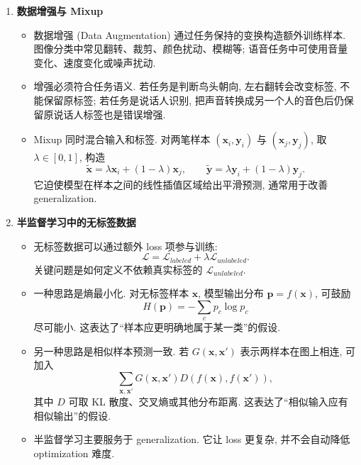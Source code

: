 \documentclass{../nndlcourse}
\begin{document}
\begin{enumerate}
\begin{itemize}
      \item 更多数据主要改善 generalization, 通常不会让 optimization 更容易. 数据越多, 模型需要同时满足的约束越多, 训练过程反而可能更难.
      \item 因此, 当 training loss 本来就降不下去时, 盲目增加数据通常不是第一优先级; 当 training loss 很低但 validation loss 很差时, 增加有代表性的数据才更直接.
    \end{itemize}
  \item \textbf{数据增强与 Mixup}
    \begin{itemize}
      \item 数据增强 (Data Augmentation) 通过任务保持的变换构造额外训练样本. 图像分类中常见翻转、裁剪、颜色扰动、模糊等; 语音任务中可使用音量变化、速度变化或噪声扰动.
      \item 增强必须符合任务语义. 若任务是判断鸟头朝向, 左右翻转会改变标签, 不能保留原标签; 若任务是说话人识别, 把声音转换成另一个人的音色后仍保留原说话人标签也是错误增强.
      \item Mixup 同时混合输入和标签. 对两笔样本 $(\boldsymbol{x}_i,\boldsymbol{y}_i)$ 与 $(\boldsymbol{x}_j,\boldsymbol{y}_j)$, 取 $\lambda \in [0,1]$, 构造
      \[
        \tilde{\boldsymbol{x}}
        =
        \lambda \boldsymbol{x}_i + (1-\lambda)\boldsymbol{x}_j,
        \qquad
        \tilde{\boldsymbol{y}}
        =
        \lambda \boldsymbol{y}_i + (1-\lambda)\boldsymbol{y}_j.
      \]
      它迫使模型在样本之间的线性插值区域给出平滑预测, 通常用于改善 generalization.
    \end{itemize}
  \item \textbf{半监督学习中的无标签数据}
    \begin{itemize}
      \item 无标签数据可以通过额外 loss 项参与训练:
      \[
        \mathcal{L}
        =
        \mathcal{L}_{labeled}
        +
        \lambda \mathcal{L}_{unlabeled}.
      \]
      关键问题是如何定义不依赖真实标签的 $\mathcal{L}_{unlabeled}$.
      \item 一种思路是熵最小化. 对无标签样本 $\boldsymbol{x}$, 模型输出分布 $\boldsymbol{p}=f(\boldsymbol{x})$, 可鼓励
      \[
        H(\boldsymbol{p}) = -\sum_c p_c \log p_c
      \]
      尽可能小. 这表达了“样本应更明确地属于某一类”的假设.
      \item 另一种思路是相似样本预测一致. 若 $G(\boldsymbol{x},\boldsymbol{x}')$ 表示两样本在图上相连, 可加入
      \[
        \sum_{\boldsymbol{x},\boldsymbol{x}'}
        G(\boldsymbol{x},\boldsymbol{x}')
        D\left(f(\boldsymbol{x}), f(\boldsymbol{x}')\right),
      \]
      其中 $D$ 可取 KL 散度、交叉熵或其他分布距离. 这表达了“相似输入应有相似输出”的假设.
      \item 半监督学习主要服务于 generalization. 它让 loss 更复杂, 并不会自动降低 optimization 难度.
    \end{itemize}
\end{enumerate}
\end{document}
